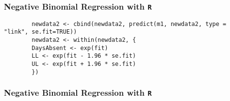 \documentclass[00-GLMregslides.tex]{subfiles}
\begin{document}
	\begin{frame}[fragile]
	\frametitle{Negative Binomial Regression with \texttt{R} }
	\Large
	
	\begin{verbatim}
		newdata2 <- cbind(newdata2, predict(m1, newdata2, type = "link", se.fit=TRUE))
		newdata2 <- within(newdata2, {
		DaysAbsent <- exp(fit)
		LL <- exp(fit - 1.96 * se.fit)
		UL <- exp(fit + 1.96 * se.fit)
		})
	\end{verbatim}

\end{frame}
\begin{frame}[fragile]
	\frametitle{Negative Binomial Regression with \texttt{R} }
	\Large
	

\end{frame}
\end{document}
